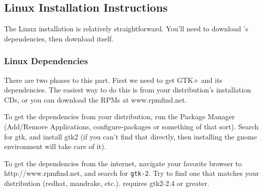 \subsection{Linux Installation Instructions}
\label{sec:linux-install}

The Linux installation is relatively straightforward.  You'll need to 
download \map{}'s dependencies, then download \map{} itself.

\subsubsection{Linux Dependencies}

There are two phases to this part.  First we need to get GTK+ and its
dependencies.  The easiest way to do this is from your distribution's 
installation CDs, or you can download the RPMs at www.rpmfind.net.  

To get the dependencies from your distribution, run the Package Manager
(Add/Remove Applications, configure-packages or something of that sort).
Search for gtk, and install gtk2 (if you can't find that directly, then 
installing the gnome environment will take care of it).

To get the dependencies from the internet, navigate your favorite browser
to  {http://www.rpmfind.net}, and
search for \texttt{gtk-2}.  Try to find one that matches your
distribution (redhat, mandrake, etc.). \map{} requires gtk2-2.4 or greater.

%

